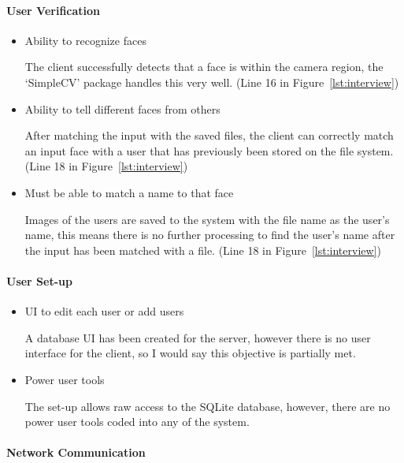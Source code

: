\documentclass[a4paper]{article}
\begin{document}
		\paragraph{User Verification}
			\begin{itemize}
				\item Ability to recognize faces

				The client successfully detects that a face is within the camera region, the `SimpleCV' package
				handles this very well. (Line 16 in Figure~\ref{lst:interview})

				\item Ability to tell different faces from others
				
				After matching the input with the saved files, the client can correctly match an input face with a
				user that has previously been stored on the file system. (Line 18 in Figure~\ref{lst:interview})

				\item Must be able to match a name to that face

				Images of the users are saved to the system with the file name as the user's name, this means there is
				no further processing to find the user's name after the input has been matched with a file. (Line 18 in Figure~\ref{lst:interview})
			\end{itemize}

		\paragraph{User Set-up}

			\begin{itemize}
				\item UI to edit each user or add users

				A database UI has been created for the server, however there is no user interface for the client, so I would
				say this objective is partially met.
				
				\item Power user tools

				The set-up allows raw access to the SQLite database, however, there are no power user tools coded into any of
				the system.
			\end{itemize}

		\paragraph{Network Communication}
		
\end{document}
